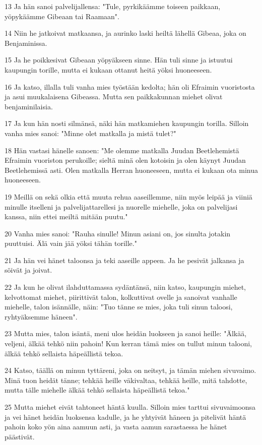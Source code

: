 \par 13 Ja hän sanoi palvelijallensa: "Tule, pyrkikäämme toiseen paikkaan, yöpykäämme Gibeaan tai Raamaan".
\par 14 Niin he jatkoivat matkaansa, ja aurinko laski heiltä lähellä Gibeaa, joka on Benjaminissa.
\par 15 Ja he poikkesivat Gibeaan yöpyäkseen sinne. Hän tuli sinne ja istuutui kaupungin torille, mutta ei kukaan ottanut heitä yöksi huoneeseen.
\par 16 Ja katso, illalla tuli vanha mies työstään kedolta; hän oli Efraimin vuoristosta ja asui muukalaisena Gibeassa. Mutta sen paikkakunnan miehet olivat benjaminilaisia.
\par 17 Ja kun hän nosti silmänsä, näki hän matkamiehen kaupungin torilla. Silloin vanha mies sanoi: "Minne olet matkalla ja mistä tulet?"
\par 18 Hän vastasi hänelle sanoen: "Me olemme matkalla Juudan Beetlehemistä Efraimin vuoriston perukoille; sieltä minä olen kotoisin ja olen käynyt Juudan Beetlehemissä asti. Olen matkalla Herran huoneeseen, mutta ei kukaan ota minua huoneeseen.
\par 19 Meillä on sekä olkia että muuta rehua aaseillemme, niin myös leipää ja viiniä minulle itselleni ja palvelijattarellesi ja nuorelle miehelle, joka on palvelijasi kanssa, niin ettei meiltä mitään puutu."
\par 20 Vanha mies sanoi: "Rauha sinulle! Minun asiani on, jos sinulta jotakin puuttuisi. Älä vain jää yöksi tähän torille."
\par 21 Ja hän vei hänet taloonsa ja teki aaseille appeen. Ja he pesivät jalkansa ja söivät ja joivat.
\par 22 Ja kun he olivat ilahduttamassa sydäntänsä, niin katso, kaupungin miehet, kelvottomat miehet, piirittivät talon, kolkuttivat ovelle ja sanoivat vanhalle miehelle, talon isännälle, näin: "Tuo tänne se mies, joka tuli sinun taloosi, ryhtyäksemme häneen".
\par 23 Mutta mies, talon isäntä, meni ulos heidän luokseen ja sanoi heille: "Älkää, veljeni, älkää tehkö niin pahoin! Kun kerran tämä mies on tullut minun talooni, älkää tehkö sellaista häpeällistä tekoa.
\par 24 Katso, täällä on minun tyttäreni, joka on neitsyt, ja tämän miehen sivuvaimo. Minä tuon heidät tänne; tehkää heille väkivaltaa, tehkää heille, mitä tahdotte, mutta tälle miehelle älkää tehkö sellaista häpeällistä tekoa."
\par 25 Mutta miehet eivät tahtoneet häntä kuulla. Silloin mies tarttui sivuvaimoonsa ja vei hänet heidän luoksensa kadulle, ja he yhtyivät häneen ja pitelivät häntä pahoin koko yön aina aamuun asti, ja vasta aamun sarastaessa he hänet päästivät.
